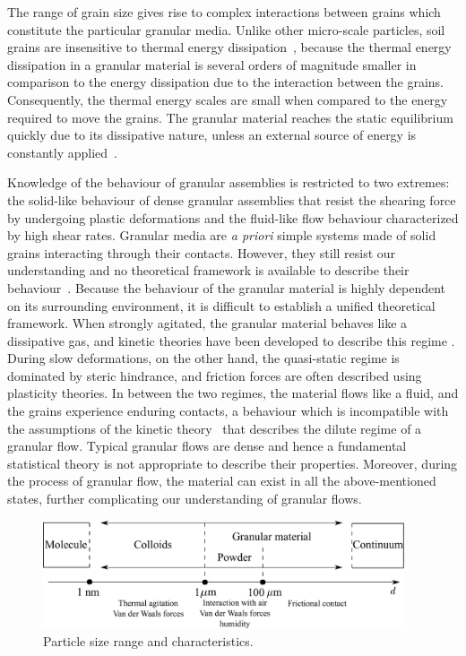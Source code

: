 The range of grain size gives rise to complex interactions between grains 
which constitute the particular granular media. Unlike other micro-scale 
particles, soil grains are insensitive to thermal energy 
dissipation~\citep{Mehta2011}, because the thermal energy 
dissipation in a granular material is several orders of magnitude smaller in 
comparison to the energy dissipation due to the interaction between the grains. 
Consequently, the thermal energy scales are small when compared to the energy 
required to move the grains. The granular material reaches the static 
equilibrium quickly due to its dissipative nature, unless an external source of 
energy is 
constantly applied~\citep{Choi2005}. 

Knowledge of the behaviour of granular assemblies 
is restricted to two extremes: the solid-like behaviour of dense granular 
assemblies that resist the shearing force by undergoing plastic deformations 
and the fluid-like flow behaviour characterized by high shear rates. Granular 
media are \textit{a priori} simple systems made of solid grains interacting 
through their contacts. However, they still resist our understanding and no 
theoretical framework is available to describe their 
behaviour~\citep{Pouliquen2006}. Because the behaviour of the granular material 
is highly dependent on its surrounding environment, it is difficult to 
establish a unified theoretical framework. When strongly agitated, the granular 
material behaves like a dissipative gas, and kinetic theories have been 
developed to describe this regime \citep{Xu2003,Popken1999}. During slow 
deformations, on the other hand, the quasi-static regime is dominated by steric 
hindrance, and friction forces are often described using plasticity theories. 
In between the two regimes, the material flows like a fluid, and the grains 
experience enduring contacts, a behaviour which is incompatible with the 
assumptions of the kinetic theory~\citep{Pouliquen2006} that describes the 
dilute regime of a granular flow. Typical granular flows are dense and hence a 
fundamental statistical theory is not appropriate to describe their properties. 
Moreover, during the process of granular flow, the material can exist in all 
the above-mentioned states, further complicating our understanding of 
granular flows.

\begin{figure}[htbp]
\centering
\includegraphics[width=0.95\textwidth]{Granular}
\caption{Particle size range and characteristics.}
\label{fig:granular}
\end{figure}

